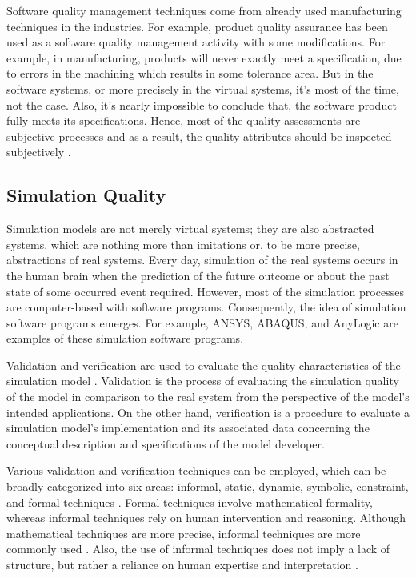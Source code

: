 \documentclass{llncs}
\begin{document}
    Software quality management techniques come from already used manufacturing techniques in the industries. For example, product quality assurance has been used as a 
    software quality management activity with some modifications. For example, in manufacturing, products will never exactly meet a specification, due to errors in the machining which results in some tolerance area. 
    But in the software systems, or more precisely in the virtual systems, it's most of the time, not the case. Also, it's nearly impossible to conclude that, 
    the software product fully meets its specifications. 
    Hence, most of the quality assessments are subjective processes and as a result, the quality attributes should be inspected subjectively \cite{SoftwareEngineering}.  

    \subsection{Simulation Quality}
    Simulation models are not merely virtual systems; they are also abstracted systems, 
    which are nothing more than imitations or, to be more precise, abstractions of real systems. 
    Every day, simulation of the real systems occurs in the human brain when the prediction of the future outcome or about the 
    past state of some occurred event required\cite{MobusSystemTheory}. However, most of the simulation processes are computer-based with software programs. Consequently, the idea of simulation software programs emerges. 
    For example, ANSYS\cite{Ansys}, ABAQUS\cite{Abaqus}, and AnyLogic\cite{AnyLogic} are examples of these simulation software programs. 

    Validation and verification are used to evaluate the quality characteristics of the simulation 
    model \cite{StewartSimulation,VerificationValidationSergent,OsmanBalci}. 
    Validation is the process of evaluating the simulation quality of the model in comparison to 
    the real system from the perspective of the model's intended applications.
    On the other hand, verification is a procedure to 
    evaluate a simulation model's implementation and its associated 
    data concerning the conceptual description and specifications of the 
    model developer\cite{StewartSimulation,VerificationValidationSergent}.

    Various validation and verification techniques can be employed, which can be broadly categorized into six areas: informal, static, dynamic, symbolic, constraint, 
    and formal techniques \cite{balcicategories}\cite{balcitechniques}. Formal techniques involve mathematical formality, whereas informal techniques rely on human intervention 
    and reasoning. Although mathematical techniques are more precise, informal techniques 
    are more commonly used \cite{balcicategories}. Also, the use of informal techniques does not imply a lack of structure, but rather a reliance on human expertise and interpretation \cite{balcitechniques}.
\end{document}
